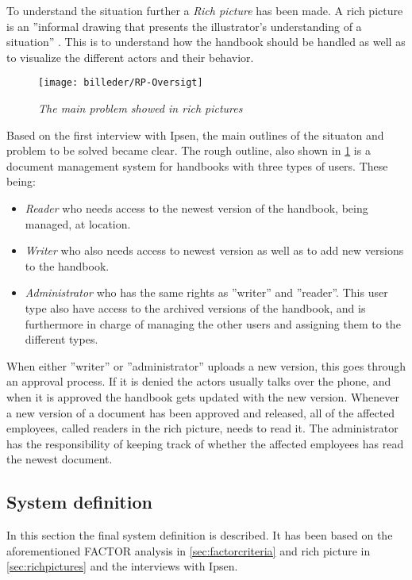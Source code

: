 To understand the situation further a \textit{Rich picture} has been made. A rich picture is an ''informal drawing that presents the illustrator's understanding of a situation'' \citep[~p. 26]{Rod-Aalborg}.
This is to understand how the handbook should be handled as well as to visualize the different actors and their behavior.

\begin{figure}[H]
	\centering
	\texttt{[image: billeder/RP-Oversigt]}
	\caption{\textit{The main problem showed in rich pictures
	}}
	\label{fig:RP-Oversigt}
\end{figure}

Based on the first interview with Ipsen, the main outlines of the situaton and problem to be solved became clear.
The rough outline, also shown in \cref{fig:RP-Oversigt} is a document management system for handbooks with three types of users. These being:
\begin{itemize}
	\item
	 \textit{Reader} who needs access to the newest version of the handbook, being managed, at location.
	\item
	 \textit{Writer} who also needs access to newest version as well as to add new versions to the handbook.
	\item
	 \textit{Administrator} who has the same rights as ''writer'' and ''reader''.
	 This user type also have access to the archived versions of the handbook, and is furthermore in charge of managing the other users and assigning them to the different types.
\end{itemize}
When either ''writer'' or ''administrator'' uploads a new version, this goes through an approval process.
If it is denied the actors usually talks over the phone, and when it is approved the handbook gets updated with the new version.
Whenever a new version of a document has been approved and released, all of the affected employees, called readers in the rich picture, needs to read it.
The administrator has the responsibility of keeping track of whether the affected employees has read the newest document.

\subsection{System definition}
In this section the final system definition is described.
It has been based on the aforementioned FACTOR analysis in \cref{sec:factorcriteria} and rich picture in \cref{sec:richpictures} and the interviews with Ipsen.

